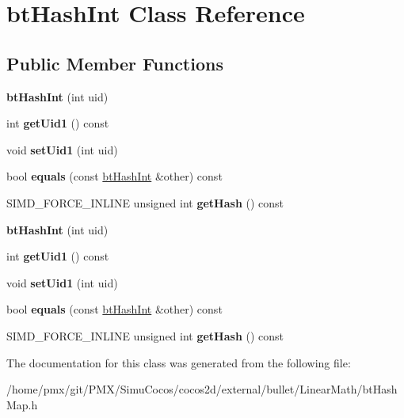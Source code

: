 \hypertarget{classbtHashInt}{}\section{bt\+Hash\+Int Class Reference}
\label{classbtHashInt}
\subsection*{Public Member Functions}
\begin{DoxyCompactItemize}
\item 
\mbox{\label{classbtHashInt_a4d5415d01ef07e62c20ee0e96042c5b6}} 
{\bfseries bt\+Hash\+Int} (int uid)
\item 
\mbox{\label{classbtHashInt_a5638ad1d1d713ccc982f822d386286f4}} 
int {\bfseries get\+Uid1} () const
\item 
\mbox{\label{classbtHashInt_a19ef17e1fc1e645c10add8125154f954}} 
void {\bfseries set\+Uid1} (int uid)
\item 
\mbox{\label{classbtHashInt_a7ac3f623c853f1db26d83248f75c407d}} 
bool {\bfseries equals} (const \hyperlink{classbtHashInt}{bt\+Hash\+Int} \&other) const
\item 
\mbox{\label{classbtHashInt_a62a6a5968efb91583f9edb8641c8918e}} 
S\+I\+M\+D\+\_\+\+F\+O\+R\+C\+E\+\_\+\+I\+N\+L\+I\+NE unsigned int {\bfseries get\+Hash} () const
\item 
\mbox{\label{classbtHashInt_a4d5415d01ef07e62c20ee0e96042c5b6}} 
{\bfseries bt\+Hash\+Int} (int uid)
\item 
\mbox{\label{classbtHashInt_a5638ad1d1d713ccc982f822d386286f4}} 
int {\bfseries get\+Uid1} () const
\item 
\mbox{\label{classbtHashInt_a19ef17e1fc1e645c10add8125154f954}} 
void {\bfseries set\+Uid1} (int uid)
\item 
\mbox{\label{classbtHashInt_a7ac3f623c853f1db26d83248f75c407d}} 
bool {\bfseries equals} (const \hyperlink{classbtHashInt}{bt\+Hash\+Int} \&other) const
\item 
\mbox{\label{classbtHashInt_a62a6a5968efb91583f9edb8641c8918e}} 
S\+I\+M\+D\+\_\+\+F\+O\+R\+C\+E\+\_\+\+I\+N\+L\+I\+NE unsigned int {\bfseries get\+Hash} () const
\end{DoxyCompactItemize}


The documentation for this class was generated from the following file\+:\begin{DoxyCompactItemize}
\item 
/home/pmx/git/\+P\+M\+X/\+Simu\+Cocos/cocos2d/external/bullet/\+Linear\+Math/bt\+Hash\+Map.\+h\end{DoxyCompactItemize}
